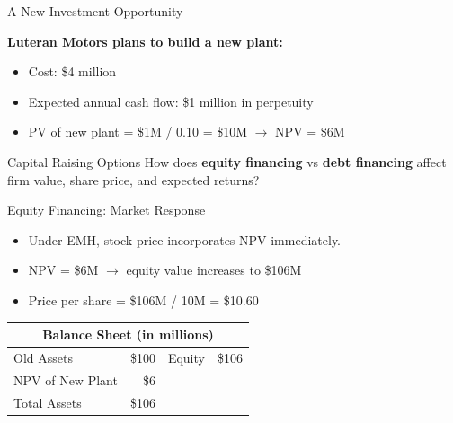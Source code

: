 \begin{frame}{A New Investment Opportunity}
	
	\textbf{Luteran Motors plans to build a new plant:}
	
	\begin{itemize}
		\item Cost: \$4 million
		\item Expected annual cash flow: \$1 million in perpetuity
		\item PV of new plant = \$1M / 0.10 = \$10M $\rightarrow$ NPV = \$6M
	\end{itemize}
	
	\begin{table}
		\centering
	\end{table}
	
	\vspace{0.2cm}
	\begin{block}{Capital Raising Options}
		How does \textbf{equity financing} vs \textbf{debt financing} affect firm value, share price, and expected returns?
	\end{block}
\end{frame}

\begin{frame}{Equity Financing: Market Response}
	
	\begin{itemize}
		\item Under EMH, stock price incorporates NPV immediately.
		\item NPV = \$6M $\rightarrow$ equity value increases to \$106M
		\item Price per share = \$106M / 10M = \$10.60
	\end{itemize}
	
	\begin{table}
		\centering
		\begin{tabular}{lrlr}
			\toprule
			\multicolumn{4}{c}{\textbf{Balance Sheet (in millions)}} \\ \midrule
			Old Assets        & \$100 & Equity   & \$106 \\
			NPV of New Plant  & \$6   &          &       \\
			Total Assets      & \$106 &          &       \\ \bottomrule
		\end{tabular}
	\end{table}
	
\end{frame}

